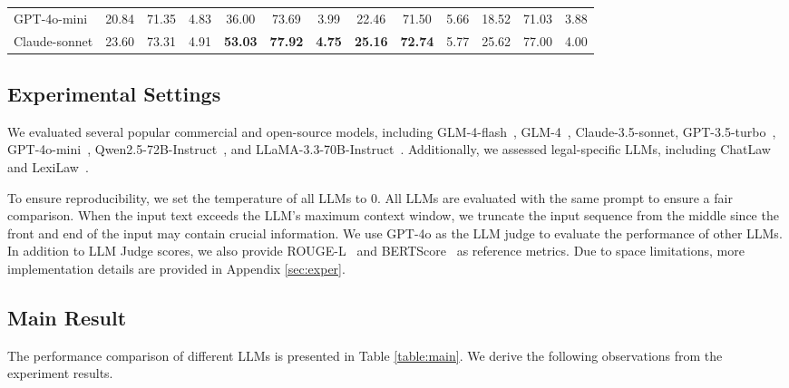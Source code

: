 \begin{table*}[t]
\begin{tabular}{lcccccccccccc}
GPT-4o-mini            & 20.84          & 71.35          & 4.83          & 36.00          & 73.69          & 3.99          & 22.46          & 71.50          & 5.66          & 18.52          & 71.03          & 3.88          \\
Claude-sonnet          & 23.60          & 73.31          & 4.91          & \textbf{53.03} & \textbf{77.92} & \textbf{4.75} & \textbf{25.16} & \textbf{72.74} & 5.77          & 25.62          & 77.00          & 4.00          \\ \hline
\end{tabular}
\caption{The main results of the four tasks in CaseGen. ``ROU.'' represents the ROUGE-L score (\%), ``BS.'' stands for BERTScore (\%), and ``LLM'' refers to the scores assigned by the LLM Judge. The best results are highlighted in bold.}
\label{table:main}
\end{table*}



\subsection{Experimental Settings}
We evaluated several popular commercial and open-source models, including GLM-4-flash~\cite{glm2024chatglm}, GLM-4~\cite{glm2024chatglm}, Claude-3.5-sonnet, GPT-3.5-turbo~\cite{achiam2023gpt}, GPT-4o-mini~\cite{achiam2023gpt}, Qwen2.5-72B-Instruct~\cite{yang2024qwen2}, and LLaMA-3.3-70B-Instruct~\cite{touvron2023llama}. Additionally, we assessed legal-specific LLMs, including ChatLaw~\cite{cui2023chatlaw} and LexiLaw~\cite{LexiLaw}.


To ensure reproducibility, we set the temperature of all LLMs to 0. 
All LLMs are evaluated with the same prompt to ensure a fair comparison.
When the input text exceeds the LLM's maximum context window, we truncate the input sequence from the middle since the front and end of the
input may contain crucial information.
We use GPT-4o as the LLM judge to evaluate the performance of other LLMs. In addition to LLM Judge scores, we also provide ROUGE-L~\cite{lin2004rouge} and BERTScore~\cite{zhang2019bertscore} as reference metrics. Due to space limitations, more implementation details are provided in Appendix \ref{sec:exper}.




\subsection{Main Result}
The performance comparison of different LLMs is presented in Table \ref{table:main}. We derive the following observations from the experiment results.

